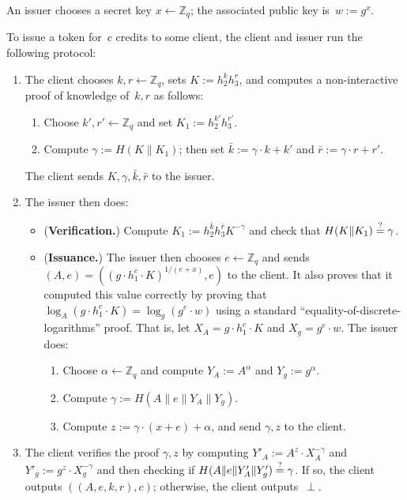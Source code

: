 \documentclass[11pt]{article}
\def\Z{{\mathbb Z}}
\def\Z{{\mathbb Z}}
\def\isequal{\stackrel{\rm ?}{=}}
\begin{document}
\medskip{}
An issuer chooses a secret key $x \leftarrow \Z_q$; the associated public key is~$w:=g^x$. 

\medskip{} 
To issue a token for~$c$ credits to some client, the client and issuer run the following protocol:
\begin{enumerate}
    \item The client chooses $k, r \leftarrow \Z_q$,  sets $K:=h_2^k h_3^r$, and computes a non-interactive proof of knowledge of~$k, r$ as follows: 
    \begin{enumerate}
        \item Choose $k', r' \leftarrow \Z_q$ and set $K_1:=h_2^{k'} h_3^{r'}$.
        \item Compute $\gamma:=H(K \| K_1)$; then set $\bar k:=\gamma \cdot k + k'$ and $\bar r := \gamma \cdot r + r'$. 
    \end{enumerate}
    The client sends $K, \gamma, \bar k, \bar r$ to the issuer.
    
    \item The issuer then does:
    \begin{itemize} 
    \item ({\bf Verification.}) Compute $K_1:= h_2^{\bar k} h_3^{\bar r} K^{-\gamma}$ and check that $H(K\|K_1) \isequal \gamma$.

\item ({\bf Issuance.}) The issuer then chooses
$e \leftarrow \Z_q$ and sends
$(A, e) = \left(\left(g \cdot h_1^c \cdot K\right)^{1/(e+x)}, e\right)$
to the client. 
It also proves that it computed this value correctly by proving that $\log_A \left(g \cdot h_1^c \cdot K\right) = \log_g \left(g^e \cdot w\right)$ using a standard ``equality-of-discrete-logarithms'' proof. 
That is, let $X_A = g \cdot h_1^c \cdot K$ and $X_g = g^e \cdot w$. The issuer does:
\begin{enumerate}
    \item Choose $\alpha \leftarrow \Z_q$ and compute $Y_A:= A^{\alpha}$ and $Y_g:=g^\alpha$.
    \item Compute $\gamma:=H(A\|e\|Y_A\|Y_g)$.
    \item Compute $z:=\gamma\cdot (x+e)+\alpha$, and send $\gamma, z$ to the client.
\end{enumerate}
\end{itemize}
\item The client verifies the proof $\gamma, z$ by computing $Y'_A:= A^z \cdot X_A^{-\gamma}$ and $Y'_g:=g^z \cdot X_g^{-\gamma}$ and then
checking if 
$H( A\|e\|Y'_A \| Y'_g ) \isequal \gamma$. If so, the client outputs $((A, e, k, r), c)$; otherwise, the client outputs~$\perp$.
\end{enumerate}
\end{document}
